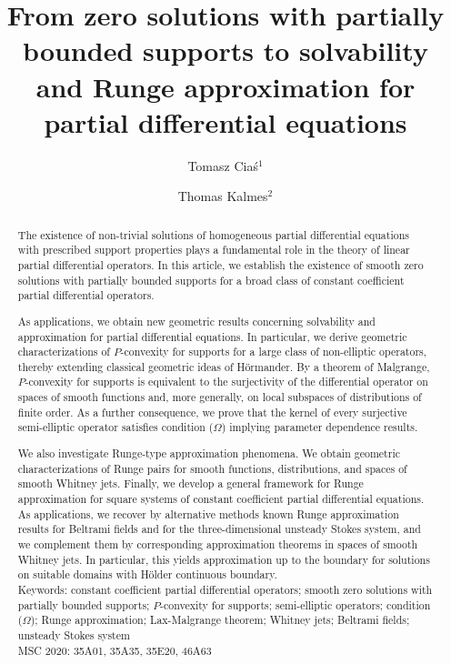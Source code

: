 \documentclass[a4paper,10pt]{amsart}
\title[Zero solutions, solvability, and {R}unge approximation]{From zero solutions with partially bounded supports to solvability and {R}unge approximation for partial differential equations}
\author[T.~Cia\'s]{Tomasz Cia\'s$^1$ \orcidlink{0000-0001-7119-7814}}
\author[T.~Kalmes]{Thomas Kalmes$^2$ \orcidlink{0000-0001-7542-1334}}
\date{}
\newtheorem*{crucial lemma}{Lemma \ref{lem:nice polynomial2}}
\theoremstyle{definition}
\begin{document}
\begin{abstract}
	The existence of non-trivial solutions of homogeneous partial differential equations with prescribed support properties plays a fundamental role in the theory of linear partial differential operators. In this article, we establish the existence of smooth zero solutions with partially bounded supports for a broad class of constant coefficient partial differential operators.
    
    As applications, we obtain new geometric results concerning solvability and approximation for partial differential equations. In particular, we derive geometric characterizations of $P$-convexity for supports for a large class of non-elliptic operators, thereby extending classical geometric ideas of H\"ormander. By a theorem of Malgrange, $P$-convexity for supports is equivalent to the surjectivity of the differential operator on spaces of smooth functions and, more generally, on local subspaces of distributions of finite order. As a further consequence, we prove that the kernel of every surjective semi-elliptic operator satisfies condition ($\Omega$) implying parameter dependence results.
    
    We also investigate Runge-type approximation phenomena. We obtain geometric characterizations of Runge pairs for smooth functions, distributions, and spaces of smooth Whitney jets. Finally, we develop a general framework for Runge approximation for square systems of constant coefficient partial differential equations. As applications, we recover by alternative methods known Runge approximation results for Beltrami fields and for the three-dimensional unsteady Stokes system, and we complement them by corresponding approximation theorems in spaces of smooth Whitney jets. In particular, this yields approximation up to the boundary for solutions on suitable domains with H\"older continuous boundary.\\
	
	\noindent Keywords: constant coefficient partial differential operators; smooth zero solutions with partially bounded supports; $P$-convexity for supports; semi-elliptic operators; condition ($\Omega$); Runge approximation; Lax-Malgrange theorem; Whitney jets; Beltrami fields; unsteady Stokes system\\
	
	\noindent MSC 2020: 35A01, 35A35, 35E20, 46A63
\end{abstract}



\maketitle
\end{document}
